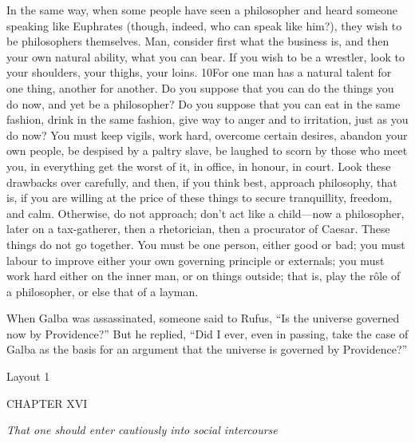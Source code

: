 In the same way, when some people have seen a philosopher and heard someone speaking like Euphrates (though, indeed, who can speak like him?), they wish to be philosophers themselves. Man, consider first what the business is, and then your own natural ability, what you can bear. If you wish to be a wrestler, look to your shoulders, your thighs, your loins. 10For one man has a natural talent for one thing, another for another. Do you suppose that you can do the things you do now, and yet be a philosopher? Do you suppose that you can eat in the same fashion, drink in the same fashion, give way to anger and to irritation, just as you do now? You must keep vigils, work hard, overcome certain desires, abandon your own people, be despised by a paltry slave, be laughed to scorn by those who meet you, in everything get the worst of it, in office, in honour, in court. Look these drawbacks over carefully, and then, if you think best, approach philosophy, that is, if you are willing at the price of these things to secure tranquillity, freedom, and calm. Otherwise, do not approach; don't act like a child—now a philosopher, later on a tax-gatherer, then a rhetorician, then a procurator of Caesar. These things do not go together. You must be one person, either good or bad; you must labour to improve either your own governing principle or externals; you must work hard either on the inner man, or on things outside; that is, play the rôle of a philosopher, or else that of a layman.

When Galba was assassinated, someone said to Rufus, ``Is the universe governed now by Providence?'' But he replied, ``Did I ever, even in
passing, take the case of Galba as the basis for an argument that the universe is governed by Providence?''



Layout 1

CHAPTER XVI

\emph{That one should enter cautiously into social intercourse}

